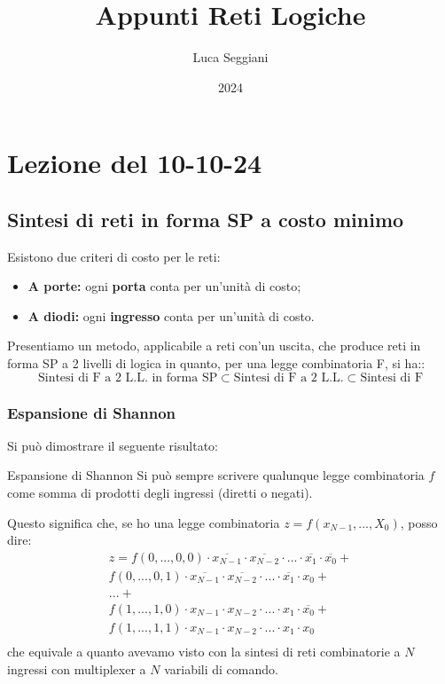 \documentclass[a4paper,11pt]{article}
\title{Appunti Reti Logiche}
\author{Luca Seggiani}
\date{2024}
\begin{document}
\section{Lezione del 10-10-24}

\thispagestyle{empty}
\pagestyle{fancy}

\subsection{Sintesi di reti in forma SP a costo minimo}
Esistono due criteri di costo per le reti:
\begin{itemize}
	\item \textbf{A porte:} ogni \textbf{porta} conta per un'unità di costo;
	\item \textbf{A diodi:} ogni \textbf{ingresso} conta per un'unità di costo.
\end{itemize}

Presentiamo un metodo, applicabile a reti con'un uscita, che produce reti in forma SP a 2 livelli di logica in quanto, per una legge combinatoria F, si ha::
$$
\text{Sintesi di F a 2 L.L. in forma SP} \subset \text{Sintesi di F a 2 L.L.} \subset \text{Sintesi di F}
$$

\subsubsection{Espansione di Shannon}
Si può dimostrare il seguente risultato:
\begin{theorem}{Espansione di Shannon}
	Si può sempre scrivere qualunque legge combinatoria $f$ come somma di prodotti degli ingressi (diretti o negati).
\end{theorem}

Questo significa che, se ho una legge combinatoria $z = f(x_{N-1}, ..., X_0)$, posso dire:
\[
	\begin{aligned}
		z = f(0, ..., 0,  0) \cdot \overline{x_{N-1}} \cdot \overline{x_{N-2}} \cdot ... \cdot \overline{x_1} \cdot \overline{x_0}	+ \\
		f(0, ..., 0, 1) \cdot \overline{x_{N-1}} \cdot \overline{x_{N-2}} \cdot ... \cdot \overline{x_1} \cdot x_0	+\\
		... + \\
		f(1, ..., 1, 0) \cdot x_{N-1} \cdot x_{N-2} \cdot ... \cdot x_1 \cdot \overline{x_0} +\\
		f(1, ..., 1, 1) \cdot x_{N-1} \cdot x_{N-2} \cdot ... \cdot x_1 \cdot x_0	\\
	\end{aligned}
\]
che equivale a quanto avevamo visto con la sintesi di reti combinatorie a $N$ ingressi con multiplexer a $N$ variabili di comando.
\end{document}
